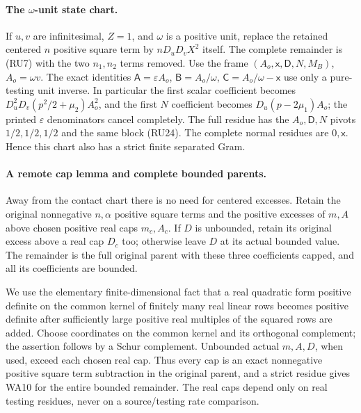 \paragraph{The $\omega$-unit state chart.}
If $u,v$ are infinitesimal, $Z=1$, and $\omega$ is a positive unit,
replace the retained centered $n$ positive square term by $nD_uD_vX^2$ itself.
The complete remainder is (RU7) with the two $n_1,n_2$ terms removed.
Use the frame $(A_o,\mathsf x,\mathsf D,N,M_B)$, $A_o=\omega v$.
The exact identities
$\mathsf A=\varepsilon A_o$, $\mathsf B=A_o/\omega$,
$\mathsf C=A_o/\omega-\mathsf x$ use only a pure-testing unit
inverse. In particular the first scalar coefficient becomes
$D_u^2D_v(p^2/2+\mu_2)A_o^2$, and the first $N$ coefficient
becomes $D_u(p-2\mu_1)A_o$; the printed $\varepsilon$ denominators
cancel completely. The full residue has the $A_o,\mathsf D,N$
pivots $1/2,1/2,1/2$ and the same block (RU24).
The complete normal residues are $0,\mathsf x$. Hence this chart
also has a strict finite separated Gram.

\paragraph{A remote cap lemma and complete bounded parents.}
Away from the contact chart there is no need for centered excesses.
Retain the original nonnegative $n,\alpha$ positive square terms and the positive
excesses of $m,A$ above chosen positive real caps $m_c,A_c$.
If $D$ is unbounded, retain its original excess above a real cap
$D_c$ too; otherwise leave $D$ at its actual bounded value.
The remainder is the full original parent with these three
coefficients capped, and all its coefficients are bounded.

We use the elementary finite-dimensional fact that a real quadratic
form positive definite on the common kernel of finitely many real
linear rows becomes positive definite after sufficiently large
positive real multiples of the squared rows are added. Choose
coordinates on the common kernel and its orthogonal complement;
the assertion follows by a Schur complement. Unbounded actual
$m,A,D$, when used, exceed each chosen real cap. Thus every cap
is an exact nonnegative positive square term subtraction in the original parent,
and a strict residue gives WA10 for the entire bounded remainder.
The real caps depend only on real testing residues, never on a
source/testing rate comparison.

